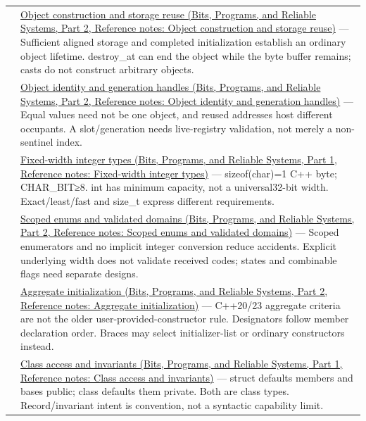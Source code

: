 {\begin{longtable}[]{@{}
  >{\raggedright\arraybackslash}p{}
  >{\raggedright\arraybackslash}p{}@{}}
106 & \href{../01-Bits-Programs-and-Reliable-Systems-P02/main.pdf\#appendix-a82f9c438857}{Object construction and storage reuse (Bits, Programs, and Reliable Systems, Part 2, Reference notes: Object construction and storage reuse)} --- Sufficient aligned storage and completed initialization establish an ordinary object lifetime. destroy\_at can end the object while the byte buffer remains; casts do not construct arbitrary objects. \\
107 & \href{../01-Bits-Programs-and-Reliable-Systems-P02/main.pdf\#appendix-f1581457d322}{Object identity and generation handles (Bits, Programs, and Reliable Systems, Part 2, Reference notes: Object identity and generation handles)} --- Equal values need not be one object, and reused addresses host different occupants. A slot/generation needs live-registry validation, not merely a non-sentinel index. \\
108 & \href{../01-Bits-Programs-and-Reliable-Systems-P01/main.pdf\#appendix-cc04044b5782}{Fixed-width integer types (Bits, Programs, and Reliable Systems, Part 1, Reference notes: Fixed-width integer types)} --- sizeof(char)=1 C++ byte; CHAR\_BIT≥8. int has minimum capacity, not a universal32-bit width. Exact/least/fast and size\_t express different requirements. \\
109 & \href{../01-Bits-Programs-and-Reliable-Systems-P02/main.pdf\#appendix-23640fcee147}{Scoped enums and validated domains (Bits, Programs, and Reliable Systems, Part 2, Reference notes: Scoped enums and validated domains)} --- Scoped enumerators and no implicit integer conversion reduce accidents. Explicit underlying width does not validate received codes; states and combinable flags need separate designs. \\
110 & \href{../01-Bits-Programs-and-Reliable-Systems-P02/main.pdf\#appendix-b7174c179542}{Aggregate initialization (Bits, Programs, and Reliable Systems, Part 2, Reference notes: Aggregate initialization)} --- C++20/23 aggregate criteria are not the older user-provided-constructor rule. Designators follow member declaration order. Braces may select initializer-list or ordinary constructors instead. \\
111 & \href{../01-Bits-Programs-and-Reliable-Systems-P01/main.pdf\#appendix-8e5214819615}{Class access and invariants (Bits, Programs, and Reliable Systems, Part 1, Reference notes: Class access and invariants)} --- struct defaults members and bases public; class defaults them private. Both are class types. Record/invariant intent is convention, not a syntactic capability limit. \\

\end{longtable}}
